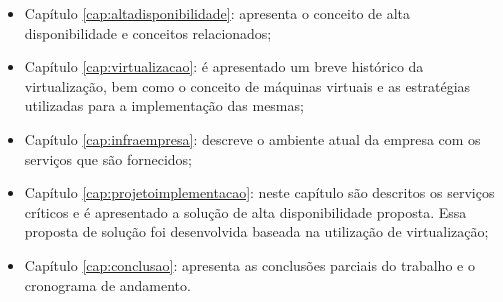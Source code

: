 \begin{itemize}
 \item Capítulo \ref{cap:altadisponibilidade}: apresenta o conceito de alta disponibilidade e conceitos relacionados;
 \item Capítulo \ref{cap:virtualizacao}: é apresentado um breve histórico da virtualização, bem como o conceito de máquinas virtuais e as 
 estratégias utilizadas para a implementação das mesmas;
 \item Capítulo \ref{cap:infraempresa}: descreve o ambiente atual da empresa com os serviços que são fornecidos;
 \item Capítulo \ref{cap:projetoimplementacao}: neste capítulo são descritos os serviços críticos e é apresentado a solução de alta disponibilidade 
 proposta. Essa proposta de solução foi desenvolvida baseada na utilização de virtualização;
 \item Capítulo \ref{cap:conclusao}: apresenta as conclusões parciais do trabalho e o cronograma de andamento.
\end{itemize}
